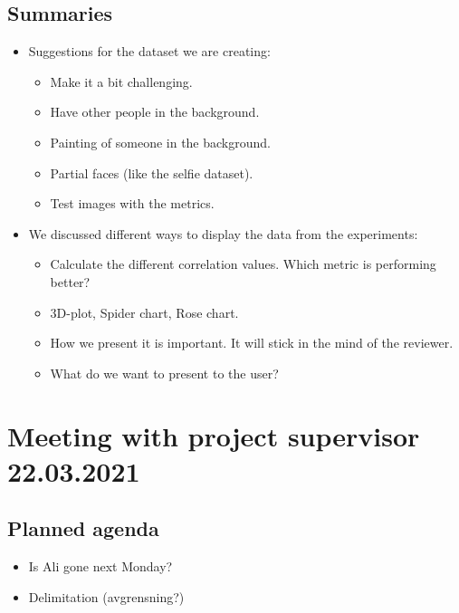 \subsection*{Summaries}
\begin{itemize}
    \item Suggestions for the dataset we are creating:
    \begin{itemize}
        \item Make it a bit challenging. 
        \item Have other people in the background. 
        \item Painting of someone in the background.
        \item Partial faces (like the selfie dataset).
        \item Test images with the metrics.
    \end{itemize}
    \item We discussed different ways to display the data from the experiments:
    \begin{itemize}
        \item Calculate the different correlation values. Which metric is performing better?
        \item 3D-plot, Spider chart, Rose chart.
        \item How we present it is important. It will stick in the mind of the reviewer. 
        \item What do we want to present to the user?
    \end{itemize}
\end{itemize}

\newpage

\section*{Meeting with project supervisor 22.03.2021}
\subsection*{Planned agenda}
\begin{itemize}
    \item Is Ali gone next Monday?
    \item Delimitation (avgrensning?)
\end{itemize}

